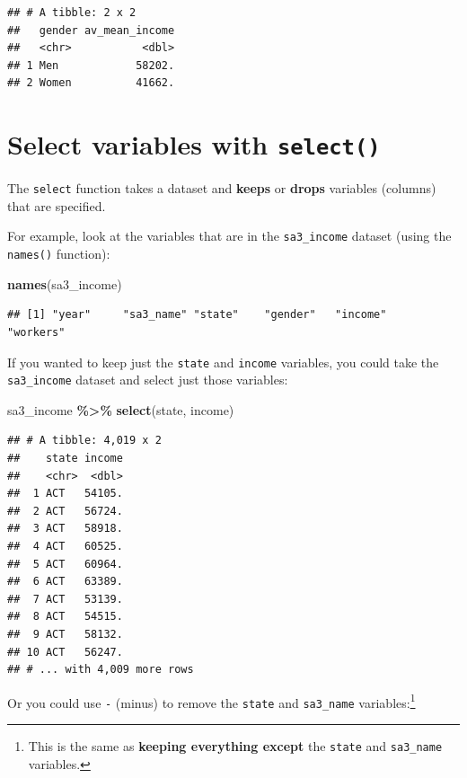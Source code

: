\documentclass[
]{book}
\newenvironment{Shaded}{\begin{snugshade}}{\end{snugshade}}
\newcommand{\KeywordTok}[1]{\textcolor[rgb]{0.13,0.29,0.53}{\textbf{#1}}}
\newcommand{\NormalTok}[1]{#1}
\newcommand{\OperatorTok}[1]{\textcolor[rgb]{0.81,0.36,0.00}{\textbf{#1}}}
\newcommand{\StringTok}[1]{\textcolor[rgb]{0.31,0.60,0.02}{#1}}
\begin{document}
\begin{verbatim}
## # A tibble: 2 x 2
##   gender av_mean_income
##   <chr>           <dbl>
## 1 Men            58202.
## 2 Women          41662.
\end{verbatim}

\hypertarget{select-variables-with-select}{%
\section{\texorpdfstring{Select variables with \texttt{select()}}{Select variables with select()}}\label{select-variables-with-select}}

The \texttt{select} function takes a dataset and \textbf{keeps} or \textbf{drops} variables (columns) that are specified.

For example, look at the variables that are in the \texttt{sa3\_income} dataset (using the \texttt{names()} function):

\begin{Shaded}
\begin{Highlighting}[]
\KeywordTok{names}\NormalTok{(sa3\_income)}
\end{Highlighting}
\end{Shaded}

\begin{verbatim}
## [1] "year"     "sa3_name" "state"    "gender"   "income"   "workers"
\end{verbatim}

If you wanted to keep just the \texttt{state} and \texttt{income} variables, you could take the \texttt{sa3\_income} dataset and select just those variables:

\begin{Shaded}
\begin{Highlighting}[]
\NormalTok{sa3\_income }\OperatorTok{\%\textgreater{}\%}\StringTok{ }
\StringTok{  }\KeywordTok{select}\NormalTok{(state, income)}
\end{Highlighting}
\end{Shaded}

\begin{verbatim}
## # A tibble: 4,019 x 2
##    state income
##    <chr>  <dbl>
##  1 ACT   54105.
##  2 ACT   56724.
##  3 ACT   58918.
##  4 ACT   60525.
##  5 ACT   60964.
##  6 ACT   63389.
##  7 ACT   53139.
##  8 ACT   54515.
##  9 ACT   58132.
## 10 ACT   56247.
## # ... with 4,009 more rows
\end{verbatim}

Or you could use \texttt{-} (minus) to remove the \texttt{state} and \texttt{sa3\_name} variables:\footnote{This is the same as \textbf{keeping everything except} the \texttt{state} and \texttt{sa3\_name} variables.}
\end{document}
